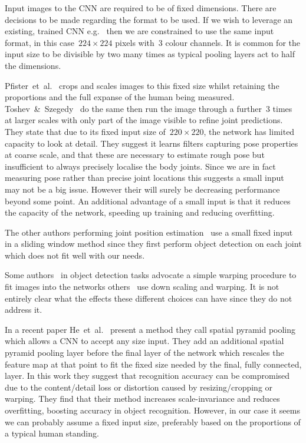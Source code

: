 \documentclass[11pt]{article} %
\begin{document}
Input images to the CNN are required to be of fixed dimensions. There are decisions to be made regarding the format to be used. If we wish to leverage an existing, trained CNN e.g.~\cite{Krizhevsky2012,Sermanet2013b} then we are constrained to use the same input format, in this case~$224 \times 224$ pixels with~3 colour channels. It is common for the input size to be divisible by two many times as typical pooling layers act to half the dimensions.

Pfister~et~al.~\cite{Pfister} crops and scales images to this fixed size whilst retaining  the proportions and the full expanse of the human being measured. Toshev~\&~Szegedy~\cite{Toshev} do the same then run the image through a further~3 times at larger scales with only part of the image visible to refine joint predictions. They state that due to its fixed input size of~$220 \times 220$, the network has limited capacity to look at detail. They suggest it learns filters capturing pose properties at coarse scale, and that these are necessary to estimate rough pose but insufficient to always precisely localise the body joints. Since we are in fact measuring pose rather than precise joint locations this suggests a small input may not be a big issue. However their will surely be decreasing performance beyond some point. An additional advantage of a small input is that it reduces the capacity of the network, speeding up training and reducing overfitting.

The other authors performing joint position estimation~\cite{Jain2014,Jain2013a,Accv2014,Li2014} use a small fixed input in a sliding window method since they first perform object detection on each joint which does not fit well with our needs. 

Some authors~\cite{Girshick2014,Donahue2014} in object detection tasks advocate a simple warping procedure to fit images into the networks others~\cite{Krizhevsky2012,Sermanet2013b} use down scaling and warping. It is not entirely clear what the effects these different choices can have since they do not address it. 

In a recent paper He~et~al.~\cite{He2014} present a method they call spatial pyramid pooling which allows a CNN to accept any size input. They add an additional spatial pyramid pooling layer before the final layer of the network which rescales the feature map at that point to fit the fixed size needed by the final, fully connected, layer. In this work they suggest that recognition accuracy can be compromised due to the content/detail loss or distortion caused by resizing/cropping or warping. They find that their method increases scale-invariance and reduces overfitting, boosting accuracy in object recognition. However, in our case it seems we can probably assume a fixed input size, preferably based on the proportions of a typical human standing.
\end{document}
